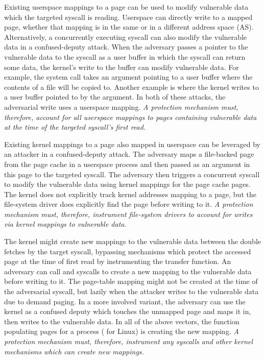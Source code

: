 \documentclass[letterpaper,twocolumn,10pt]{article}
\begin{document}
Existing userspace mappings to a page can be used to modify 
vulnerable data which the targeted syscall is reading.
Userspace can directly write to a mapped page, whether that mapping is 
in the same or in a different address space (AS). 
Alternatively, a concurrently executing syscall can also modify the 
vulnerable data in a confused-deputy attack.
When the adversary passes a pointer to the vulnerable data to 
the syscall as a user buffer in which the syscall can return some 
data, the kernel's write to the buffer can modify vulnerable data.
For example, the  system call takes an argument pointing 
to a user buffer where the contents of a file will be copied to.
Another example is  where the kernel writes to 
a user buffer pointed to by the  argument.
In both of these attacks, the adversarial write uses a userspace
mapping. 
\emph{A protection mechanism must, therefore, account for all userspace 
mappings to pages containing vulnerable data at the time of the 
targeted syscall's first read.}

Existing kernel mappings to a page also mapped in userspace can be 
leveraged by an attacker in a confused-deputy attack.
The adversary maps a file-backed page from the page cache in a
userspace process and then passed as an argument in this page to the 
targeted syscall.
The adversary then triggers a concurrent  syscall to modify the 
vulnerable data using kernel mappings for the page cache
pages.
The kernel does not explicitly track kernel addresses mapping to a page, 
but the file-system driver does explicitly find the page before writing to it.
\emph{A protection mechanism must, therefore, instrument file-system 
drivers to account for writes via kernel mappings to vulnerable data.}

The kernel might create new mappings to the vulnerable data 
between the double fetches by the target syscall, bypassing mechanisms
which protect the accessed page at the time of first read by 
instrumenting the transfer function.
An adversary can call  and  syscalls to create 
a new mapping to the vulnerable data before writing to it.
The page-table mapping might not be created at the time of the adversarial 
syscall, but lazily when the attacker writes to the vulnerable data
due to demand paging.
In a more involved variant, the adversary can use the kernel as a 
confused deputy which touches the unmapped page and maps it in, 
then writes to the vulnerable data.
In all of the above vectors, the function populating pages for a 
process ( for Linux) is creating the new mapping.
\emph{A protection mechanism must, therefore, instrument any syscalls 
and other kernel mechanisms which can create new mappings.}
\end{document}

